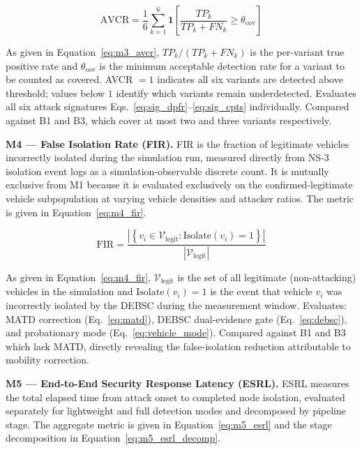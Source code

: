 \documentclass[12pt, a4paper]{report}
\newcommand{\mypar}{\vspace{0.8em}\noindent}
\begin{document}
\begin{equation}
\label{eq:m3_avcr}
\text{AVCR} =
\frac{1}{6}
\sum_{k=1}^{6}
\mathbf{1}\!\left[
\frac{TP_k}{TP_k + FN_k} \geq \theta_{\text{cov}}
\right]
\end{equation}

As given in Equation~\eqref{eq:m3_avcr}, $TP_k / (TP_k + FN_k)$ is the
per-variant true positive rate and $\theta_{\text{cov}}$ is the minimum
acceptable detection rate for a variant to be counted as covered. AVCR $= 1$
indicates all six variants are detected above threshold; values below $1$
identify which variants remain underdetected. Evaluates all six attack
signatures Eqs.~\eqref{eq:sig_dpfr}--\eqref{eq:sig_cpts} individually.
Compared against B1 and B3, which cover at most two and three variants
respectively.

\mypar
\textbf{M4 --- False Isolation Rate (FIR).}
FIR is the fraction of legitimate vehicles incorrectly isolated during
the simulation run, measured directly from NS-3 isolation event logs as a
simulation-observable discrete count. It is mutually exclusive from M1
because it is evaluated exclusively on the confirmed-legitimate vehicle
subpopulation at varying vehicle densities and attacker ratios. The metric
is given in Equation~\eqref{eq:m4_fir}.

\begin{equation}
\label{eq:m4_fir}
\text{FIR} =
\frac{\left|\left\{
v_i \in \mathcal{V}_{\text{legit}} :
\mathrm{Isolate}(v_i) = 1
\right\}\right|}
{|\mathcal{V}_{\text{legit}}|}
\end{equation}

As given in Equation~\eqref{eq:m4_fir}, $\mathcal{V}_{\text{legit}}$ is
the set of all legitimate (non-attacking) vehicles in the simulation and
$\mathrm{Isolate}(v_i) = 1$ is the event that vehicle $v_i$ was incorrectly
isolated by the DEBSC during the measurement window. Evaluates: MATD
correction (Eq.~\eqref{eq:matd}), DEBSC dual-evidence gate
(Eq.~\eqref{eq:debsc}), and probationary mode (Eq.~\eqref{eq:vehicle_mode}).
Compared against B1 and B3 which lack MATD, directly revealing the
false-isolation reduction attributable to mobility correction.

\mypar
\textbf{M5 --- End-to-End Security Response Latency (ESRL).}
ESRL measures the total elapsed time from attack onset to completed node
isolation, evaluated separately for lightweight and full detection modes
and decomposed by pipeline stage. The aggregate metric is given in
Equation~\eqref{eq:m5_esrl} and the stage decomposition in
Equation~\eqref{eq:m5_esrl_decomp}.
\end{document}
